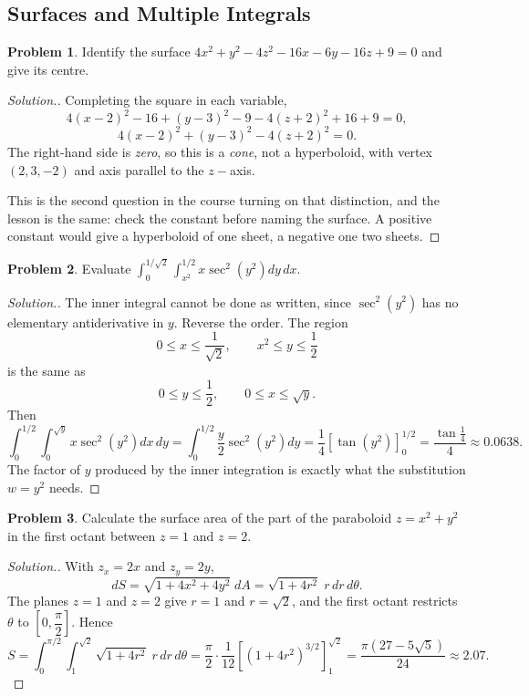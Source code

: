 \documentclass[11pt,a4paper]{article}
\theoremstyle{definition}
\newtheorem{problemx}{Problem}[subsection]
\newenvironment{problem}{\begin{problemx}}{\end{problemx}}
\newenvironment{solution}
  {\renewcommand{\qedsymbol}{}\begin{proof}[\textit{Solution}.]}
  {\end{proof}}
\begin{document}
\subsection{Surfaces and Multiple Integrals}

\begin{problem}
Identify the surface $4x^2+y^2-4z^2-16x-6y-16z+9 = 0$ and give its centre.
\end{problem}
\begin{solution}
Completing the square in each variable,
\[4(x-2)^2 - 16 + (y-3)^2 - 9 - 4(z+2)^2 + 16 + 9 = 0 ,\]
\[4(x-2)^2 + (y-3)^2 - 4(z+2)^2 = 0 .\]
The right-hand side is \emph{zero}, so this is a \emph{cone}, not a hyperboloid,
with vertex $(2,3,-2)$ and axis parallel to the $z-$axis.

This is the second question in the course turning on that distinction, and the
lesson is the same: check the constant before naming the surface. A positive
constant would give a hyperboloid of one sheet, a negative one two sheets.
\end{solution}

\begin{problem}
Evaluate
$\displaystyle{\int_0^{1/\sqrt2}\int_{x^2}^{1/2}x\sec^2(y^2)dy\,dx}$.
\end{problem}
\begin{solution}
The inner integral cannot be done as written, since $\sec^2(y^2)$ has no
elementary antiderivative in $y$. Reverse the order. The region
\[0\leq x\leq\frac{1}{\sqrt2},\qquad x^2\leq y\leq\frac12\]
is the same as
\[0\leq y\leq\frac12,\qquad 0\leq x\leq\sqrt y .\]
Then
\[\int_0^{1/2}\int_0^{\sqrt y}x\sec^2(y^2)dx\,dy
= \int_0^{1/2}\frac{y}{2}\sec^2(y^2)dy
= \frac14[\tan(y^2)]_0^{1/2}
= \frac{\tan\frac14}{4}\approx 0.0638 .\]
The factor of $y$ produced by the inner integration is exactly what the
substitution $w = y^2$ needs.
\end{solution}

\begin{problem}
Calculate the surface area of the part of the paraboloid $z = x^2+y^2$ in the
first octant between $z=1$ and $z=2$.
\end{problem}
\begin{solution}
With $z_x = 2x$ and $z_y = 2y$,
\[dS = \sqrt{1+4x^2+4y^2}\;dA = \sqrt{1+4r^2}\;r\,dr\,d\theta .\]
The planes $z=1$ and $z=2$ give $r=1$ and $r=\sqrt2$, and the first octant
restricts $\theta$ to $\left[0,\dfrac{\pi}{2}\right]$. Hence
\[S = \int_0^{\pi/2}\int_1^{\sqrt2}\sqrt{1+4r^2}\;r\,dr\,d\theta
= \frac{\pi}{2}\cdot\frac{1}{12}[(1+4r^2)^{3/2}]_1^{\sqrt2}
= \frac{\pi(27-5\sqrt5)}{24}\approx 2.07 .\]
\end{solution}
\end{document}
